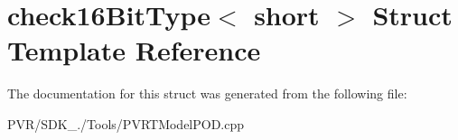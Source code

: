 \hypertarget{structcheck16_bit_type_3_01short_01_4}{\section{check16\+Bit\+Type$<$ short $>$ Struct Template Reference}
\label{structcheck16_bit_type_3_01short_01_4}
}


The documentation for this struct was generated from the following file\+:\begin{DoxyCompactItemize}
\item 
P\+V\+R/\+S\+D\+K\+\_./\+Tools/P\+V\+R\+T\+Model\+P\+O\+D.\+cpp\end{DoxyCompactItemize}
